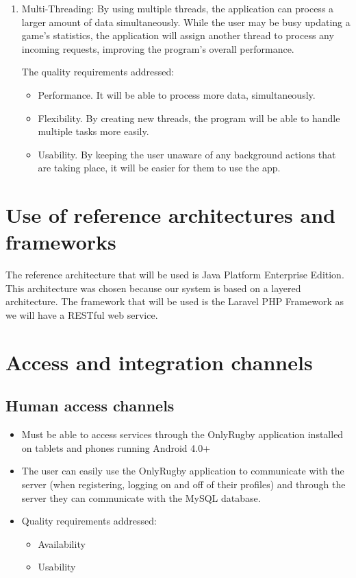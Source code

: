 \documentclass[hidelinks,a4paper,12pt]{article}
\begin{document}
\begin{enumerate}
		\item Multi-Threading:
		By using multiple threads, the application can process a larger amount of data simultaneously. While the user may be busy updating a game's statistics, the application will assign another thread to process any incoming requests, improving the program's overall performance.

		The quality requirements addressed:
		\begin{itemize}
			\item Performance. It will be able to process more data, simultaneously.
			\item Flexibility. By creating new threads, the program will be able to handle multiple tasks more easily.
			\item Usability. By keeping the user unaware of any background actions that are taking place, it will be easier for them to use the app.
		\end{itemize}
	\end{enumerate}

\section{Use of reference architectures and frameworks}
	The reference architecture that will be used is Java Platform Enterprise Edition. This architecture was chosen because our system is based on a layered architecture. The framework that will be used is the Laravel PHP Framework as we will have a RESTful web service.

\section{Access and integration channels}
	\subsection{Human access channels}
	\begin{itemize}
		\item Must be able to access services through the OnlyRugby application installed on tablets and phones running Android 4.0+
		\item The user can easily use the OnlyRugby application to communicate with the server (when registering, logging on and off of their profiles) and through the server they can communicate with the MySQL database.
		\item Quality requirements addressed:
			\begin{itemize}
				\item Availability
				\item Usability
			\end{itemize}
	\end{itemize}
\end{document}
